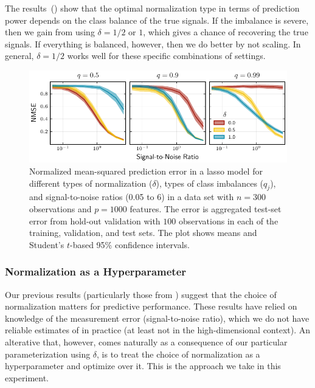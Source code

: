 The results~() show that the optimal normalization type in terms of
prediction power depends on the class balance of the true signals. If the imbalance is
severe, then we gain from using \(\delta=1/2\) or \(1\), which gives a chance of recovering
the true signals. If everything is balanced, however, then we do better by not scaling. In
general, \(\delta=1/2\) works well for these specific combinations of settings.

\begin{figure}[htpb]
  \centering
  \includegraphics[]{plots/binary_data_sim.pdf}
  \caption{%
    Normalized mean-squared prediction error in a lasso model for different types of
    normalization (\(\delta\)), types of class imbalances (\(q_j\)), and signal-to-noise ratios
    (0.05 to 6) in a data set with \(n=300\) observations and \(p = \num{1000}\) features. The
    error is aggregated test-set error from hold-out validation with \(100\) observations in
    each of the training, validation, and test sets. The plot shows means and Student's
    \(t\)-based 95\% confidence intervals. } \label{fig:binary-sim}
\end{figure}

\subsubsection{Normalization as a Hyperparameter}\label{sec:experiments-hyperparameter}

Our previous results (particularly those from ) suggest
that the choice of normalization matters for predictive performance. These results have
relied on knowledge of the measurement error (signal-to-noise ratio), which we do not have
reliable estimates of in practice (at least not in the high-dimensional context). An
alterative that, however, comes naturally as a consequence of our particular
parameterization using \(\delta\), is to treat the choice of normalization as a
hyperparameter and optimize over it. This is the approach we take in this experiment.

